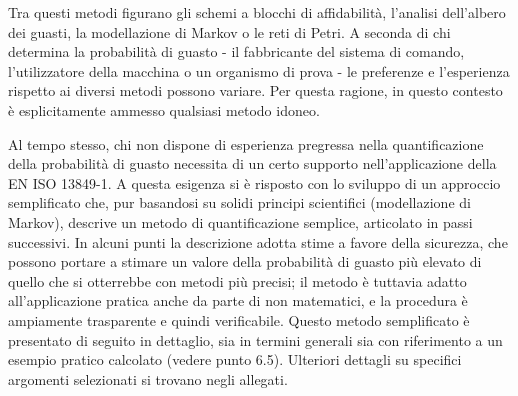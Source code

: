 Tra questi metodi figurano gli schemi a blocchi di affidabilità, l'analisi dell'albero dei guasti, la modellazione di Markov o le reti di Petri. A seconda di chi determina la probabilità di guasto - il fabbricante del sistema di comando, l'utilizzatore della macchina o un organismo di prova - le preferenze e l'esperienza rispetto ai diversi metodi possono variare. Per questa ragione, in questo contesto è esplicitamente ammesso qualsiasi metodo idoneo.

Al tempo stesso, chi non dispone di esperienza pregressa nella quantificazione della probabilità di guasto necessita di un certo supporto nell'applicazione della EN ISO 13849-1. A questa esigenza si è risposto con lo sviluppo di un approccio semplificato che, pur basandosi su solidi principi scientifici (modellazione di Markov), descrive un metodo di quantificazione semplice, articolato in passi successivi. In alcuni punti la descrizione adotta stime a favore della sicurezza, che possono portare a stimare un valore della probabilità di guasto più elevato di quello che si otterrebbe con metodi più precisi; il metodo è tuttavia adatto all'applicazione pratica anche da parte di non matematici, e la procedura è ampiamente trasparente e quindi verificabile. Questo metodo semplificato è presentato di seguito in dettaglio, sia in termini generali sia con riferimento a un esempio pratico calcolato (vedere punto 6.5). Ulteriori dettagli su specifici argomenti selezionati si trovano negli allegati.

